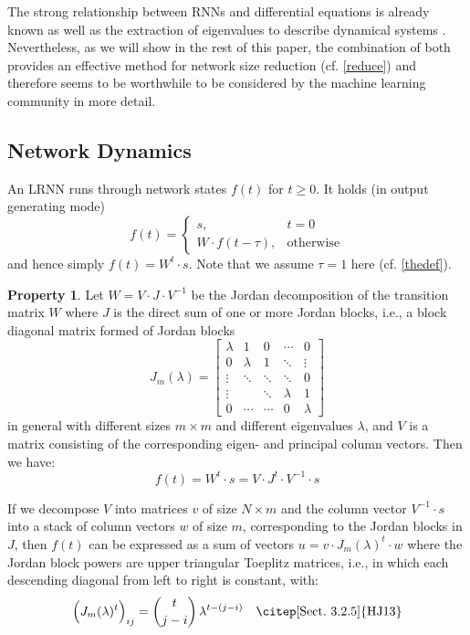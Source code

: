 \documentclass[twoside,11pt]{article}
\theoremstyle{definition}
\newtheorem{prop}{Property}
\begin{document}
The strong relationship between RNNs and differential equations is already known
\citep[Sect.~9]{KB+16} as well as the extraction of eigenvalues to describe
dynamical systems \citep[Sect.~5]{Str15}. Nevertheless, as we will show in the
rest of this paper, the combination of both provides an effective method for
network size reduction (cf. \cref{reduce}) and therefore seems to be worthwhile
to be considered by the machine learning community in more detail.

\subsection{Network Dynamics}\label{dynamics}

An LRNN runs through network states $f(t)$ for $t
\ge 0$. It holds (in output generating mode)
\[ f(t) = \left\{ \begin{array}{ll}
	s, & t=0\\
	W \cdot f(t-\tau), & \text{otherwise}
\end{array} \right. \]
and hence simply $f(t) = W^t \cdot s$. Note that we assume $\tau = 1$ here (cf. \cref{thedef}).

\begin{prop}\label{jordan}
Let $W = V \cdot J \cdot V^{-1}$ be the Jordan decomposition of the transition
matrix $W$ where $J$ is the direct sum of one or more Jordan blocks, i.e., a
block diagonal matrix formed of Jordan blocks
\[ J_m(\lambda) = \left[ \begin{array}{*{5}{c}}
  \lambda & 1 & 0 & \cdots & 0\\
  0 & \lambda & 1 & \ddots & \vdots\\
  \vdots & \ddots & \ddots & \ddots & 0\\
  \vdots & & \ddots & \lambda & 1\\
  0 & \cdots & \cdots & 0 & \lambda
\end{array} \right] \]
in general with different sizes $m \times m$ and different eigenvalues $\lambda$,
and $V$ is a matrix consisting of the corresponding eigen- and principal column vectors.
Then we have: \[ f(t) = W^t \cdot s = V \cdot J^t \cdot V^{-1} \cdot s \]

If we decompose $V$ into matrices $v$ of size $N \times m$ and the column vector
$V^{-1} \cdot s$ into a stack of column vectors $w$ of size $m$, corresponding
to the Jordan blocks in $J$, then $f(t)$ can be expressed as a sum of vectors $u
= v \cdot J_m(\lambda)^t \cdot w$ where the Jordan block powers are upper
triangular Toeplitz matrices, i.e., in which each descending diagonal from left
to right is constant, with:
\begin{equation}\label{power}
  \Big( J_m(\lambda)^t \Big)_{ij} = \binom{t}{j-i}\,\lambda^{t-(j-i)}
	\quad\text{\citep[Sect.~3.2.5]{HJ13}}
\end{equation}
\end{prop}
\end{document}
